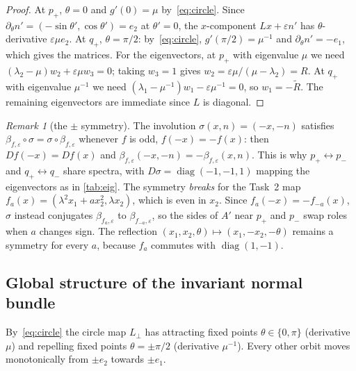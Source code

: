 \documentclass[11pt,a4paper]{article}
\theoremstyle{definition}
\theoremstyle{remark}
\newtheorem{remark}[theorem]{Remark}
\newcommand{\eps}{\varepsilon}
\newcommand{\Lperp}{L_\perp}
\DeclareMathOperator{\diag}{diag}
\begin{document}
\begin{proof}
At $p_+$, $\theta=0$ and $g'(0)=\mu$ by~\eqref{eq:circle}. Since $\partial_\theta n'=(-\sin\theta',\cos\theta')=e_2$
at $\theta'=0$, the $x$-component $Lx+\eps n'$ has $\theta$-derivative $\eps\mu e_2$. At $q_+$, $\theta=\pi/2$:
by~\eqref{eq:circle}, $g'(\pi/2)=\mu^{-1}$ and $\partial_\theta n'=-e_1$, which gives the matrices. For the
eigenvectors, at $p_+$ with eigenvalue $\mu$ we need $(\lambda_2-\mu)w_2+\eps\mu w_3=0$; taking $w_3=1$ gives
$w_2=\eps\mu/(\mu-\lambda_2)=R$. At $q_+$ with eigenvalue $\mu^{-1}$ we need $(\lambda_1-\mu^{-1})w_1-\eps\mu^{-1}=0$, so
$w_1=-\tilde R$. The remaining eigenvectors are immediate since $L$ is diagonal.
\end{proof}

\begin{remark}[the $\pm$ symmetry]\label{rem:symmetry}
The involution $\sigma(x,n)=(-x,-n)$ satisfies $\beta_{f,\eps}\circ\sigma=\sigma\circ\beta_{f,\eps}$ whenever $f$ is
odd, $f(-x)=-f(x)$: then $Df(-x)=Df(x)$ and $\beta_{f,\eps}(-x,-n)=-\beta_{f,\eps}(x,n)$. This is why $p_+\leftrightarrow p_-$
and $q_+\leftrightarrow q_-$ share spectra, with $D\sigma=\diag(-1,-1,1)$ mapping the eigenvectors as in
\cref{tab:eig}. The symmetry \emph{breaks} for the Task~2 map $f_a(x)=(\lambda^2x_1+ax_2^2,\lambda x_2)$, which is even in $x_2$.
Since $f_a(-x)=-f_{-a}(x)$, $\sigma$ instead conjugates $\beta_{f_a,\eps}$ to $\beta_{f_{-a},\eps}$, so the sides of $A'$
near $p_+$ and $p_-$ swap roles when $a$ changes sign. The reflection $(x_1,x_2,\theta)\mapsto(x_1,-x_2,-\theta)$ remains a
symmetry for every $a$, because $f_a$ commutes with $\diag(1,-1)$.
\end{remark}

\subsection{Global structure of the invariant normal bundle}

By~\eqref{eq:circle} the circle map $\Lperp$ has attracting fixed points $\theta\in\{0,\pi\}$ (derivative $\mu$) and
repelling fixed points $\theta=\pm\pi/2$ (derivative $\mu^{-1}$). Every other orbit moves monotonically from $\pm e_2$
towards $\pm e_1$.
\end{document}
